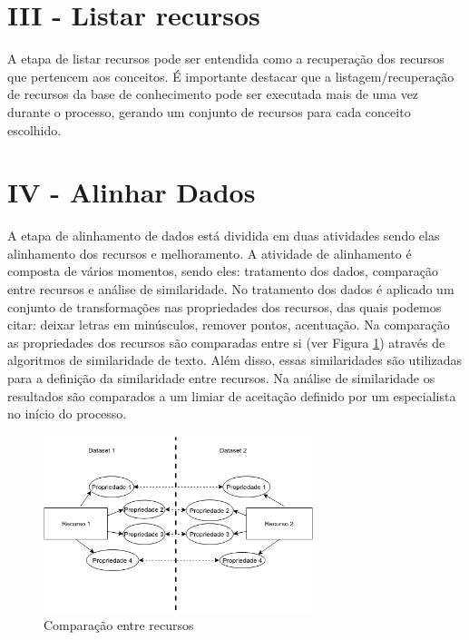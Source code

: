 \section*{III - Listar recursos}
A etapa de listar recursos pode ser entendida como a recuperação dos recursos que pertencem aos conceitos. É importante destacar que a listagem/recuperação de recursos da base de conhecimento pode ser executada mais de uma vez durante o processo, gerando um conjunto de recursos para cada conceito escolhido.


\section*{IV - Alinhar Dados}
A etapa de alinhamento de dados está dividida em duas atividades sendo elas alinhamento dos recursos e melhoramento. A atividade de alinhamento é composta de vários momentos, sendo eles: tratamento dos dados, comparação entre recursos e análise de similaridade.
No tratamento dos dados é aplicado um conjunto de transformações nas propriedades dos recursos, das quais podemos citar: deixar letras em minúsculos, remover pontos, acentuação.
Na comparação as propriedades dos recursos são comparadas entre si (ver Figura \ref{fig:resources}) através de algoritmos de similaridade de texto. Além disso, essas similaridades são utilizadas para a definição da similaridade entre recursos. Na análise de similaridade os resultados são comparados a um limiar de aceitação definido por um especialista no início do processo.

\begin{figure}[!ht]
	\centering
	\includegraphics[width=0.7\textwidth]{./imagens/resources.png}
    \caption{Comparação entre recursos}
	\label{fig:resources}
\end{figure}